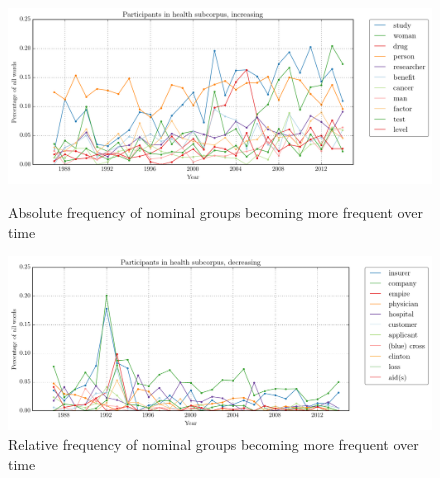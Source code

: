     \noindent
    \begin{figure}[htb!]
    \centering
    \begin{minipage}{.42\textwidth}
    \centering
    \includegraphics[width=1\textwidth]{../images/1.png}
    \caption{Absolute frequency of nominal groups becoming more frequent over time}
    \label{fig:1}
    \end{minipage}%
    \begin{minipage}{.42\textwidth}
    \centering
    \includegraphics[width=1\textwidth]{../images/2.png}
    \caption{Relative frequency of nominal groups becoming more frequent over time}
    \label{fig:2}
    \end{minipage}
    \end{figure}
    \noindent
